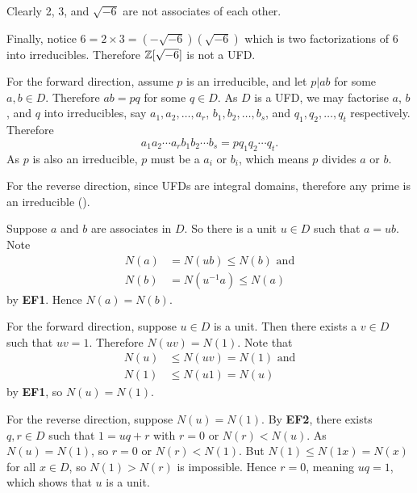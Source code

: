 \begin{questions}
    Clearly 2, 3, and $\sqrt{-6}$ are not associates of each other.

    Finally, notice $6 = 2 \times 3 = (-\sqrt{-6})(\sqrt{-6})$ which is two factorizations of 6 into irreducibles. Therefore $\mathbb{Z}[\sqrt{-6}]$ is not a UFD.
    
    \item For the forward direction, assume $p$ is an irreducible, and let $p \vert ab$ for some $a,b \in D$. Therefore $ab = pq$ for some $q \in D$. As $D$ is a UFD, we may factorise $a$, $b$, and $q$ into irreducibles, say $a_1, a_2, \dots, a_r$, $b_1, b_2, \dots, b_s$, and $q_1, q_2, \dots, q_t$ respectively. Therefore
    \[
        a_1a_2\cdots a_r b_1b_2\cdots b_s = p q_1q_2\cdots q_t.
    \]
    As $p$ is also an irreducible, $p$ must be a $a_i$ or $b_i$, which means $p$ divides $a$ or $b$.
    
    For the reverse direction, since UFDs are integral domains, therefore any prime is an irreducible ().
    
    \item \begin{partquestions}{\alph*}
        \item Suppose $a$ and $b$ are associates in $D$. So there is a unit $u \in D$ such that $a = ub$. Note
        \begin{align*}
            N(a) &= N(ub) \leq N(b) \text{ and}\\
            N(b) &= N(u^{-1}a) \leq N(a)
        \end{align*}
        by \textbf{EF1}. Hence $N(a) = N(b)$.
        
        \item For the forward direction, suppose $u \in D$ is a unit. Then there exists a $v \in D$ such that $uv = 1$. Therefore $N(uv) = N(1)$. Note that
        \begin{align*}
            N(u) &\leq N(uv) = N(1) \text{ and}\\
            N(1) &\leq N(u1) = N(u)
        \end{align*}
        by \textbf{EF1}, so $N(u) = N(1)$.

        For the reverse direction, suppose $N(u) = N(1)$. By \textbf{EF2}, there exists $q, r \in D$ such that $1 = uq + r$ with $r = 0$ or $N(r) < N(u)$. As $N(u) = N(1)$, so $r = 0$ or $N(r) < N(1)$. But $N(1) \leq N(1x) = N(x)$ for all $x \in D$, so $N(1) > N(r)$ is impossible. Hence $r = 0$, meaning $uq = 1$, which shows that $u$ is a unit.
    \end{partquestions}
    

\end{questions}
